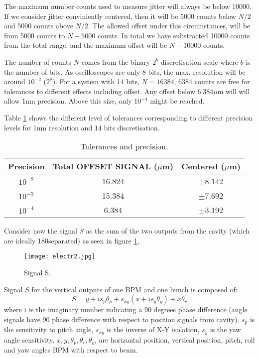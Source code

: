 The maximum number counts used to measure jitter will always be below 10000. If we consider jitter conviniently centered, then it will be 5000 counts below $N/2$ and 5000 counts above $N/2$. The allowed offset under this circumstances, will be from 5000 counts to $N-5000$ counts. In total we have substracted 10000 counts from the total range, and the maximum offset will be $N-10000$ counts.\par
The number of counts $N$ comes from the binary $2^b$ discretisation scale where $b$ is the number of bits. As oscilloscopes are only 8 bits, the max. resolution will be around $10^{-2}$ ($2^8$). For a system with 14 bits, $N=16384$,  6384 counts are free for tolerances to different effects including offset. Any offset below $6.384\mu$m will will allow 1nm precision. Above this size, only $10^{-4}$ might be reached.\par
Table \ref{toletab} shows the different level of tolerances corresponding to different precision levels for 1nm resolution and 14 bits discretisation.\par
\begin{table}[hbt]
\begin{center}
 \begin{tabular}{|c|c|c|}\hline
 Precision & Total OFFSET SIGNAL ($\mu$m) & Centered ($\mu$m)\\\hline
 $10^{-2}$ &16.824&$\pm$8.142 \\\hline
 $10^{-3}$ &15.384&$\pm$7.692\\\hline
 $10^{-4}$ &6.384&$\pm$3.192\\\hline
 \end{tabular}
 \caption{Tolerances and precision.}\label{toletab}
 \end{center}
\end{table}
Consider now the signal $S$ as the sum of the two outputs from the cavity (which are ideally 180\degre separated) as seen in figure \ref{Ssignal},\par
\begin{figure}[htb]
 \begin{center}
  \texttt{[image: electr2.jpg]}\caption{Signal S.}\label{Ssignal}
 \end{center}
\end{figure}
Signal $S$ for the vertical outputs of one BPM and one bunch is composed of:
\begin{equation}
S = y+is_p\theta_p+s_{xy}(x+is_y\theta_y)+x\theta_r
\end{equation}
where $i$ is the imaginary number indicating a 90 degrees phase difference (angle signals have 90 phase difference with respect to position signals from cavity). $s_p$ is the sensitivity to pitch angle, $s_{xy}$ is the inverse of X-Y isolation, $s_y$ is the yaw angle sensitivity. $x,y,\theta_p,\theta_r,\theta_y$, are horizontal position, vertical position, pitch, roll and yaw angles BPM with respect to beam.\par
